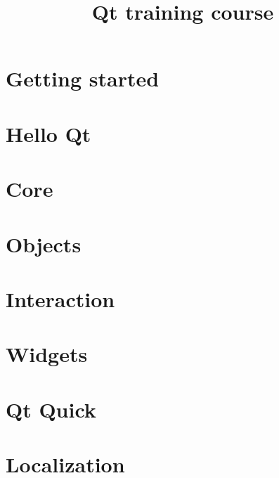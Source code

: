 \documentclass[compress,table,xcolor=table]{beamer}
\begin{document}
\title{Qt training course}

\frame{\titlepage}



\section{Getting started}



\section{Hello Qt}


\section{Core}



\section{Objects}




\section{Interaction}





\section{Widgets}




\section{Qt Quick}


\section{Localization}





\end{document}
